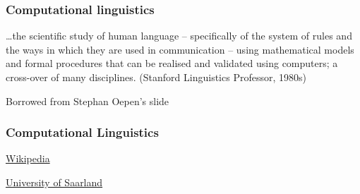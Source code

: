 \documentclass{beamer}
\begin{document}





\begin{frame}

\frametitle{Computational linguistics}

\ldots the scientific study of human language -- specifically of the system of rules and the ways in which they are used in communication -- using mathematical models and formal procedures that can be realised and validated using computers; a cross-over of many disciplines. (Stanford Linguistics Professor, 1980s) 

\hfill \footnotesize Borrowed from Stephan Oepen's slide

\end{frame}





\begin{frame}

\frametitle{Computational Linguistics}


\href{https://en.wikipedia.org/wiki/Computational_linguistics}{Wikipedia}

\bigskip

\href{http://www.coli.uni-saarland.de/~hansu/what_is_cl.html}{University of Saarland}


\end{frame}
\end{document}
